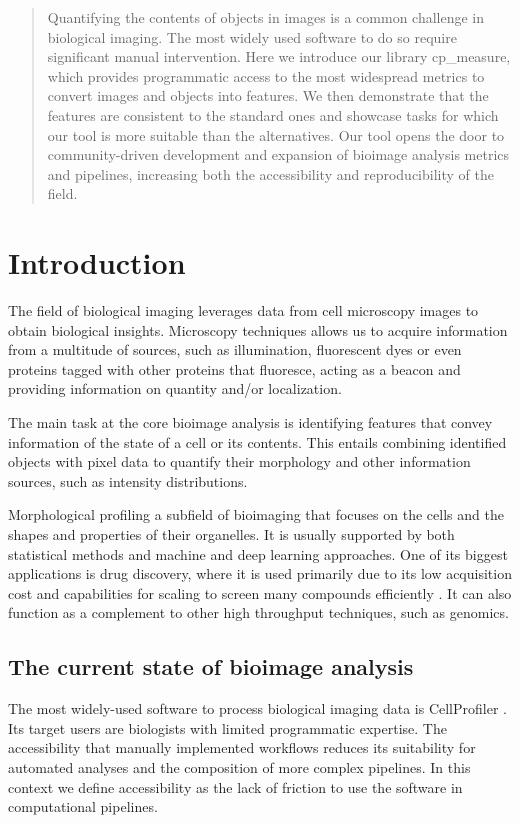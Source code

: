 \documentclass{article}
\begin{document}
\begin{abstract}
Quantifying the contents of objects in images is a common challenge in biological imaging. The most widely used software to do so require significant manual intervention. Here we introduce our library cp\_measure, which provides programmatic access to the most widespread metrics to convert images and objects into features. We then demonstrate that the features are consistent to the standard ones and showcase tasks for which our tool is more suitable than the alternatives. Our tool opens the door to community-driven  development and expansion of bioimage analysis metrics and pipelines, increasing both the accessibility and reproducibility of the field.
\end{abstract}
\section{Introduction}
\label{sec:org6430daa}
The field of biological imaging leverages data from cell microscopy images to obtain biological insights. Microscopy techniques allows us to acquire information from a multitude of sources, such as illumination, fluorescent dyes or even proteins tagged with other proteins that fluoresce, acting as a beacon and providing information on quantity and/or localization.

The main task at the core bioimage analysis is identifying features that convey information of the state of a cell or its contents. This entails combining identified objects with pixel data to quantify their morphology and other information sources, such as intensity distributions.

Morphological profiling a subfield of bioimaging that focuses on the cells and the shapes and properties of their organelles. It is usually supported by both statistical methods and machine and deep learning approaches. One of its biggest applications is drug discovery, where it is used primarily due to its low acquisition cost and capabilities for scaling to screen many compounds efficiently \citep{sealDecadeSystematicReview2024}. It can also function as a complement to other high throughput techniques, such as genomics.
\subsection{The current state of bioimage analysis}
\label{sec:org8f5b33d}
The most widely-used software to process biological imaging data is CellProfiler \citep{stirlingCellProfiler4Improvements2021}. Its target users are biologists with limited programmatic expertise. The accessibility that manually implemented workflows reduces its suitability for automated analyses and the composition of more complex pipelines. In this context we define accessibility as the lack of friction to use the software in computational pipelines.
\end{document}
